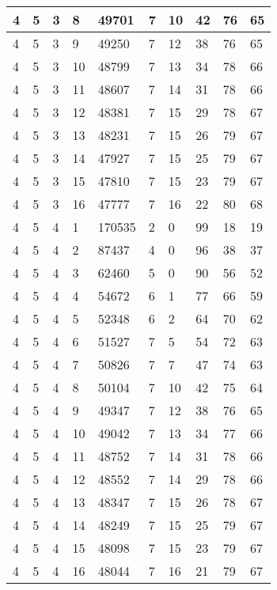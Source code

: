 \begin{table}[!ht]
\begin{tabular}{|l|l|l|l|l|l|l|l|l|l|}
        4 & 5 & 3 & 8 & 49701 & 7 & 10 & 42 & 76 & 65 \\ \hline
        4 & 5 & 3 & 9 & 49250 & 7 & 12 & 38 & 76 & 65 \\ \hline
        4 & 5 & 3 & 10 & 48799 & 7 & 13 & 34 & 78 & 66 \\ \hline
        4 & 5 & 3 & 11 & 48607 & 7 & 14 & 31 & 78 & 66 \\ \hline
        4 & 5 & 3 & 12 & 48381 & 7 & 15 & 29 & 78 & 67 \\ \hline
        4 & 5 & 3 & 13 & 48231 & 7 & 15 & 26 & 79 & 67 \\ \hline
        4 & 5 & 3 & 14 & 47927 & 7 & 15 & 25 & 79 & 67 \\ \hline
        4 & 5 & 3 & 15 & 47810 & 7 & 15 & 23 & 79 & 67 \\ \hline
        4 & 5 & 3 & 16 & 47777 & 7 & 16 & 22 & 80 & 68 \\ \hline
        4 & 5 & 4 & 1 & 170535 & 2 & 0 & 99 & 18 & 19 \\ \hline
        4 & 5 & 4 & 2 & 87437 & 4 & 0 & 96 & 38 & 37 \\ \hline
        4 & 5 & 4 & 3 & 62460 & 5 & 0 & 90 & 56 & 52 \\ \hline
        4 & 5 & 4 & 4 & 54672 & 6 & 1 & 77 & 66 & 59 \\ \hline
        4 & 5 & 4 & 5 & 52348 & 6 & 2 & 64 & 70 & 62 \\ \hline
        4 & 5 & 4 & 6 & 51527 & 7 & 5 & 54 & 72 & 63 \\ \hline
        4 & 5 & 4 & 7 & 50826 & 7 & 7 & 47 & 74 & 63 \\ \hline
        4 & 5 & 4 & 8 & 50104 & 7 & 10 & 42 & 75 & 64 \\ \hline
        4 & 5 & 4 & 9 & 49347 & 7 & 12 & 38 & 76 & 65 \\ \hline
        4 & 5 & 4 & 10 & 49042 & 7 & 13 & 34 & 77 & 66 \\ \hline
        4 & 5 & 4 & 11 & 48752 & 7 & 14 & 31 & 78 & 66 \\ \hline
        4 & 5 & 4 & 12 & 48552 & 7 & 14 & 29 & 78 & 66 \\ \hline
        4 & 5 & 4 & 13 & 48347 & 7 & 15 & 26 & 78 & 67 \\ \hline
        4 & 5 & 4 & 14 & 48249 & 7 & 15 & 25 & 79 & 67 \\ \hline
        4 & 5 & 4 & 15 & 48098 & 7 & 15 & 23 & 79 & 67 \\ \hline
        4 & 5 & 4 & 16 & 48044 & 7 & 16 & 21 & 79 & 67 \\ \hline

\end{tabular}
\end{table}

